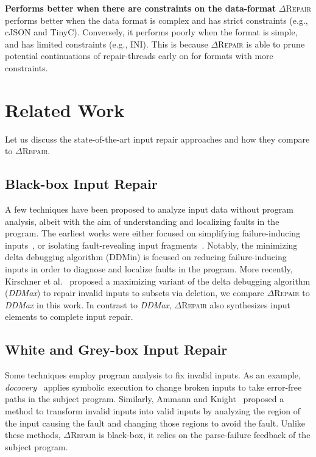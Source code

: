 \documentclass[sigconf,review,anonymous]{acmart}
\newcommand{\ddmin}{\textit{ddmin}\xspace}
\newcommand{\approach}{\textsc{$\Delta$Repair}\xspace}
\def\ddmin{DDMin\xspace}
\newcommand{\ddmax}{\textit{DDMax}\xspace}
\newcommand{\drepair}{\approach}
\begin{document}
\noindent\textbf{Performs better when there are constraints on the data-format}
\drepair performs better when the data format is complex and has strict constraints (e.g., cJSON and TinyC).
Conversely, it performs poorly when the format is simple, and has
limited constraints (e.g., INI). This is because \drepair is able to prune
potential continuations of repair-threads early on for formats with
more constraints.

\section{Related Work}
\label{sec:relatedwork}

Let us discuss the state-of-the-art input repair approaches and how they compare to \approach. 

\subsection{Black-box Input Repair} 
A few techniques have been proposed to analyze input data without program analysis, albeit with the aim of understanding and localizing faults in the program. The earliest works were either focused on simplifying failure-inducing inputs~\cite{zeller2002simplifying, clause2009penumbra}, or isolating fault-revealing input fragments~\cite{hierarchicalDD, sterling2007automated}. Notably, the minimizing delta debugging algorithm (\ddmin) is focused on reducing failure-inducing inputs in order to diagnose and localize faults in the program. More recently, Kirschner et al.~\cite{kirschner2020debugging} proposed a maximizing variant of the delta debugging algorithm (\ddmax) to repair invalid inputs to subsets via deletion, we compare \approach to \ddmax in this work. In contrast to \ddmax, \approach also synthesizes input elements to complete input repair. 


\subsection{White and Grey-box Input Repair} Some techniques employ program analysis to fix invalid inputs. As an example, \emph{docovery}~\cite{docovery:ase14} applies symbolic execution to change broken inputs to take error-free paths in the subject program. Similarly, Ammann and Knight~\cite{data_diversity} proposed a method to transform invalid inputs into valid inputs by analyzing the region of the input causing the fault and changing those regions to avoid the fault. Unlike these methods, \approach 
is black-box, it relies on the parse-failure feedback of the subject program. 
\end{document}

